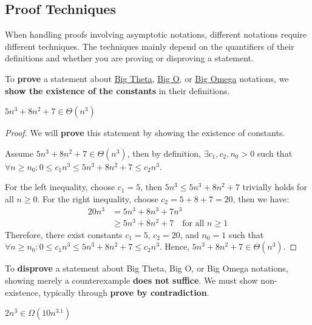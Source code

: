 \subsection{Proof Techniques}\label{subsec:proof-techniques}

When handling proofs involving asymptotic notations, different notations require different techniques.
The techniques mainly depend on the quantifiers of their definitions and whether you are proving or disproving a statement.

To \textbf{prove} a statement about \hyperref[def:big-theta-notation]{Big Theta}, \hyperref[def:big-o-notation]{Big O}, or \hyperref[def:big-omega-notation]{Big Omega} notations, we \textbf{show the existence of the constants} in their definitions.

\begin{proposition}
    $5n^3 + 8n^2 + 7 \in \Theta(n^3)$
\end{proposition}

\begin{proof}
    We will \textbf{prove} this statement by showing the existence of constants.

    Assume $5n^3 + 8n^2 + 7 \in \Theta(n^3)$, then by definition, $\exists c_1, c_2, n_0 > 0$ such that $\forall n\geq n_0 : 0 \leq c_1n^3 \leq 5n^3 + 8n^2 + 7 \leq c_2n^3$.

    For the left inequality, choose $c_1=5$, then $5n^3 \leq 5n^3 + 8n^2 + 7$ trivially holds for all $n\geq 0$.
    For the right inequality, choose $c_2=5+8+7=20$, then we have:
    \begin{align*}
        20n^3 &= 5n^3 + 8n^3 + 7n^3 \\
        &\geq 5n^3 + 8n^2 + 7 \quad\text{for all } n\geq 1
    \end{align*}
    Therefore, there exist constants $c_1=5$, $c_2=20$, and $n_0=1$ such that $\forall n\geq n_0 : 0 \leq c_1n^3 \leq 5n^3 + 8n^2 + 7 \leq c_2n^3$.
    Hence, $5n^3 + 8n^2 + 7 \in \Theta(n^3)$.
\end{proof}

To \textbf{disprove} a statement about Big Theta, Big O, or Big Omega notations, showing merely a counterexample \textbf{does not suffice}.
We must show non-existence, typically through \textbf{prove by contradiction}.

\begin{proposition}
    $2n^{3} \in \Omega(10n^{3.1})$
\end{proposition}

